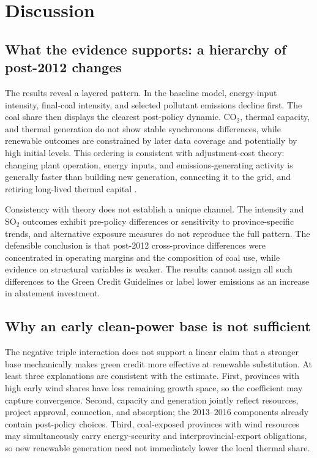 \documentclass[11pt]{article}
\begin{document}
\section{Discussion}

\subsection{What the evidence supports: a hierarchy of post-2012 changes}

The results reveal a layered pattern. In the baseline model, energy-input intensity, final-coal intensity, and selected pollutant emissions decline first. The coal share then displays the clearest post-policy dynamic. CO$_2$, thermal capacity, and thermal generation do not show stable synchronous differences, while renewable outcomes are constrained by later data coverage and potentially by high initial levels. This ordering is consistent with adjustment-cost theory: changing plant operation, energy inputs, and emissions-generating activity is generally faster than building new generation, connecting it to the grid, and retiring long-lived thermal capital \parencite{portervanderlinde1995,unruh2000,geels2002}.

Consistency with theory does not establish a unique channel. The intensity and SO$_2$ outcomes exhibit pre-policy differences or sensitivity to province-specific trends, and alternative exposure measures do not reproduce the full pattern. The defensible conclusion is that post-2012 cross-province differences were concentrated in operating margins and the composition of coal use, while evidence on structural variables is weaker. The results cannot assign all such differences to the Green Credit Guidelines or label lower emissions as an increase in abatement investment.

\subsection{Why an early clean-power base is not sufficient}

The negative triple interaction does not support a linear claim that a stronger base mechanically makes green credit more effective at renewable substitution. At least three explanations are consistent with the estimate. First, provinces with high early wind shares have less remaining growth space, so the coefficient may capture convergence. Second, capacity and generation jointly reflect resources, project approval, connection, and absorption; the 2013--2016 components already contain post-policy choices. Third, coal-exposed provinces with wind resources may simultaneously carry energy-security and interprovincial-export obligations, so new renewable generation need not immediately lower the local thermal share.
\end{document}
